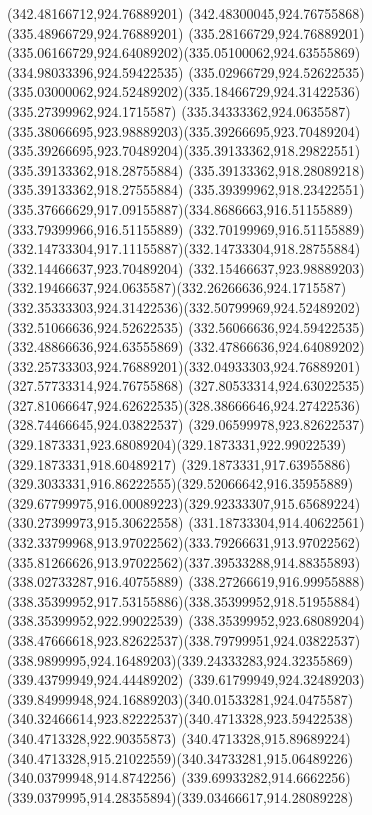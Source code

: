 {{{{				\lineto(342.48166712,924.76889201)
				\lineto(342.48300045,924.76755868)
				\lineto(335.48966729,924.76889201)
				\curveto(335.28166729,924.76889201)(335.06166729,924.64089202)(335.05100062,924.63555869)
				\lineto(334.98033396,924.59422535)
				\lineto(335.02966729,924.52622535)
				\curveto(335.03000062,924.52489202)(335.18466729,924.31422536)(335.27399962,924.1715587)
				\curveto(335.34333362,924.0635587)(335.38066695,923.98889203)(335.39266695,923.70489204)
				\curveto(335.39266695,923.70489204)(335.39133362,918.29822551)(335.39133362,918.28755884)
				\lineto(335.39133362,918.28089218)
				\lineto(335.39133362,918.27555884)
				\lineto(335.39399962,918.23422551)
				\curveto(335.37666629,917.09155887)(334.8686663,916.51155889)(333.79399966,916.51155889)
				\curveto(332.70199969,916.51155889)(332.14733304,917.11155887)(332.14733304,918.28755884)
				\lineto(332.14466637,923.70489204)
				\curveto(332.15466637,923.98889203)(332.19466637,924.0635587)(332.26266636,924.1715587)
				\curveto(332.35333303,924.31422536)(332.50799969,924.52489202)(332.51066636,924.52622535)
				\lineto(332.56066636,924.59422535)
				\lineto(332.48866636,924.63555869)
				\curveto(332.47866636,924.64089202)(332.25733303,924.76889201)(332.04933303,924.76889201)
				\lineto(327.57733314,924.76755868)
				\lineto(327.80533314,924.63022535)
				\curveto(327.81066647,924.62622535)(328.38666646,924.27422536)(328.74466645,924.03822537)
				\curveto(329.06599978,923.82622537)(329.1873331,923.68089204)(329.1873331,922.99022539)
				\lineto(329.1873331,918.60489217)
				\curveto(329.1873331,917.63955886)(329.3033331,916.86222555)(329.52066642,916.35955889)
				\curveto(329.67799975,916.00089223)(329.92333307,915.65689224)(330.27399973,915.30622558)
				\curveto(331.18733304,914.40622561)(332.33799968,913.97022562)(333.79266631,913.97022562)
				\curveto(335.81266626,913.97022562)(337.39533288,914.88355893)(338.02733287,916.40755889)
				\curveto(338.27266619,916.99955888)(338.35399952,917.53155886)(338.35399952,918.51955884)
				\lineto(338.35399952,922.99022539)
				\curveto(338.35399952,923.68089204)(338.47666618,923.82622537)(338.79799951,924.03822537)
				\curveto(338.9899995,924.16489203)(339.24333283,924.32355869)(339.43799949,924.44489202)
				\curveto(339.61799949,924.32489203)(339.84999948,924.16889203)(340.01533281,924.0475587)
				\curveto(340.32466614,923.82222537)(340.4713328,923.59422538)(340.4713328,922.90355873)
				\lineto(340.4713328,915.89689224)
				\curveto(340.4713328,915.21022559)(340.34733281,915.06489226)(340.03799948,914.8742256)
				\curveto(339.69933282,914.6662256)(339.0379995,914.28355894)(339.03466617,914.28089228)
}}}}

